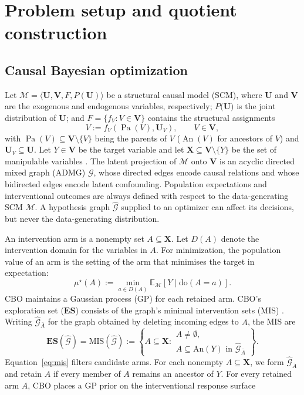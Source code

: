 \documentclass[twoside]{article}
\newcommand{\E}{\mathbb{E}}
\newcommand{\doo}{\mathrm{do}}
\newcommand{\An}{\mathrm{An}}
\newcommand{\ES}{\mathbf{ES}}
\begin{document}
\section{Problem setup and quotient construction}
\label{sec:setup}

\subsection{Causal Bayesian optimization}

Let
$\mathcal M=\langle\mathbf U,\mathbf V,F,P(\mathbf U)\rangle$ be a structural causal model (SCM), where \(\mathbf U\) and \(\mathbf V\) are the exogenous and endogenous variables, respectively; \(P({\mathbf U)}\) is the joint distribution of \(\mathbf U\); and \(F=\{f_V:V\in\mathbf V\}\) contains the structural assignments
\[
V := f_V\!\left(\operatorname{Pa}(V),\mathbf U_V\right),
\qquad V\in\mathbf V,
\] with \(\operatorname{Pa}(V)\subseteq\mathbf V\setminus\{V\}\) being the parents of $V$ (\(\operatorname{An}(V)\) for ancestors of $V$) and \(\mathbf U_V\subseteq\mathbf U\). Let \(Y\in\mathbf V\) be the target variable and let \(\mathbf X\subseteq\mathbf V\setminus\{Y\}\) be the set of manipulable variables \citep{pearlCausality2009}. The latent projection of \(\mathcal M\) onto \(\mathbf V\) is an acyclic directed mixed graph (ADMG) \(\mathcal G\), whose directed edges encode causal relations and whose bidirected edges encode latent confounding. Population expectations and interventional outcomes are always defined with respect to the data-generating SCM \(\mathcal M\). A hypothesis graph \(\widehat{\mathcal G}\) supplied to an optimizer can affect its decisions, but never the data-generating distribution.

An intervention arm is a nonempty set $A\subseteq\mathbf X$. Let $D(A)$ denote the intervention domain for the variables in $A$. For minimization, the population value of an arm is the setting of the arm that minimises the target in expectation:
\begin{equation}
  \mu^\star(A):=\min_{a\in D(A)}
  \E_{\mathcal M}\!\left[Y\mid\doo(A=a)\right].
  \label{eq:arm-value}
\end{equation}
CBO maintains a Gaussian process (GP) for each retained arm. CBO's exploration set ($\ES$) consists of the graph's minimal intervention sets (MIS) \citep{leeStructuralCausalBandits,agliettiCausalBayesianOptimization2020b}.
Writing ${\widehat{\mathcal G}}_{\bar A}$ for the graph obtained by deleting incoming edges to $A$, the MIS are
\begin{equation}
  \ES({\widehat{\mathcal G}})=\mathrm{MIS}({\widehat{\mathcal G}})
  :=\left\{A\subseteq\mathbf X:
  \substack{A\ne\emptyset,\\
  A\subseteq\An(Y)\text{ in }{\widehat{\mathcal G}}_{\bar A}}\right\}.
  \label{eq:mis}
\end{equation}
Equation~\eqref{eq:mis} filters candidate arms. For each nonempty $A\subseteq\mathbf X$, we form $\widehat{\mathcal G}_{\bar A}$ and retain $A$ if every member of $A$ remains an ancestor of $Y$.
For every retained arm $A$, CBO places a GP prior on the interventional response surface
\end{document}
